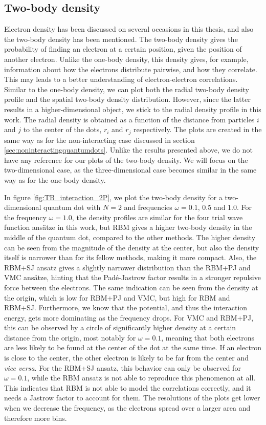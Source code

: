 \subsection{Two-body density}
Electron density has been discussed on several occasions in this thesis, and also the two-body density has been mentioned. The two-body density gives the probability of finding an electron at a certain position, given the position of another electron. Unlike the one-body density, this density gives, for example, information about how the electrons distribute pairwise, and how they correlate. This may leads to a better understanding of electron-electron correlations. Similar to the one-body density, we can plot both the radial two-body density profile and the spatial two-body density distribution. However, since the latter results in a higher-dimensional object, we stick to the radial density profile in this work. The radial density is obtained as a function of the distance from particles $i$ and $j$ to the center of the dots, $r_i$ and $r_j$ respectively. The plots are created in the same way as for the non-interacting case discussed in section \ref{sec:noninteractingquantumdots}. Unlike the results presented above, we do not have any reference for our plots of the two-body density. We will focus on the two-dimensional case, as the three-dimensional case becomes similar in the same way as for the one-body density. 

In figure \eqref{fig:TB_interaction_2P}, we plot the two-body density for a two-dimensional quantum dot with $N=2$ and frequencies $\omega=0.1$, 0.5 and 1.0. For the frequency $\omega=1.0$, the density profiles are similar for the four trial wave function ansätze in this work, but RBM gives a higher two-body density in the middle of the quantum dot, compared to the other methods. The higher density can be seen from the magnitude of the density at the center, but also the density itself is narrower than for its fellow methods, making it more compact. Also, the RBM+SJ ansatz gives a slightly narrower distribution than the RBM+PJ and VMC ansätze, hinting that the Padé-Jastrow factor results in a stronger repulsive force between the electrons. The same indication can be seen from the density at the origin, which is low for RBM+PJ and VMC, but high for RBM and RBM+SJ. Furthermore, we know that the potential, and thus the interaction energy, gets more dominating as the frequency drops. For VMC and RBM+PJ, this can be observed by a circle of significantly higher density at a certain distance from the origin, most notably for $\omega=0.1$, meaning that both electrons are less likely to be found at the center of the dot at the same time. If an electron is close to the center, the other electron is likely to be far from the center and \textit{vice versa}. For the RBM+SJ ansatz, this behavior can only be observed for $\omega=0.1$, while the RBM ansatz is not able to reproduce this phenomenon at all. This indicates that RBM is not able to model the correlations correctly, and it needs a Jastrow factor to account for them. The resolutions of the plots get lower when we decrease the frequency, as the electrons spread over a larger area and therefore more bins.

